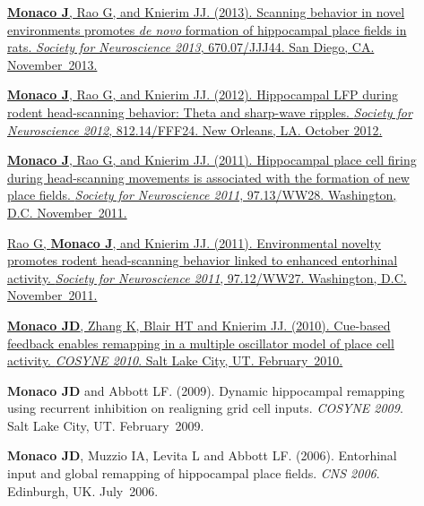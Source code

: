 \documentclass[10pt]{article}
\begin{document}
\begin{description}
\item[\quad] \href{http://www.abstractsonline.com/Plan/ViewAbstract.aspx?sKey=32eccac1-4e1d-4e81-bf5c-f39bcb605757&cKey=4710dece-cc8e-4b48-8764-49ea174b91ef&mKey=8d2a5bec-4825-4cd6-9439-b42bb151d1cf}{\textbf{Monaco J}, Rao G, and Knierim JJ. (2013). Scanning behavior in novel environments promotes \emph{de novo} formation of hippocampal place fields in rats. \emph{Society for Neuroscience 2013}, 670.07/JJJ44. San Diego, CA. November~2013.}
\item[\quad] \href{http://www.abstractsonline.com/Plan/ViewAbstract.aspx?sKey=f5b9fa94-7d15-48c7-9d67-b89cd2883025&cKey=a53349ca-41b1-4664-b022-85d0d1fe59b8&mKey=\%7b70007181-01C9-4DE9-A0A2-EEBFA14CD9F1\%7d}{\textbf{Monaco J}, Rao G, and Knierim JJ. (2012). Hippocampal LFP during rodent head-scanning behavior: Theta and sharp-wave ripples. \emph{Society for Neuroscience 2012}, 812.14/FFF24. New Orleans, LA. October 2012.}
\item[\quad] \href{http://www.abstractsonline.com/Plan/ViewAbstract.aspx?sKey=c48e9f5f-1274-4486-85bf-38ee591629e1&cKey=190bd951-c183-428d-a4c5-01eb61556d79&mKey=\%7b8334BE29-8911-4991-8C31-32B32DD5E6C8\%7d}{\textbf{Monaco J}, Rao G, and Knierim JJ. (2011). Hippocampal place cell firing during head-scanning movements is associated with the formation of new place fields. \emph{Society for Neuroscience 2011}, 97.13/WW28. Washington, D.C. November~2011.}
\item[\quad] \href{http://www.abstractsonline.com/Plan/ViewAbstract.aspx?sKey=c48e9f5f-1274-4486-85bf-38ee591629e1&cKey=3ec26e6f-8c59-4be2-bad3-e1572d75e07e&mKey=\%7b8334BE29-8911-4991-8C31-32B32DD5E6C8\%7d}{Rao G, \textbf{Monaco J}, and Knierim JJ. (2011). Environmental novelty promotes rodent head-scanning behavior linked to enhanced entorhinal activity. \emph{Society for Neuroscience 2011}, 97.12/WW27. Washington, D.C. November~2011.}
\item[\quad] \href{http://www.frontiersin.org/10.3389/conf.fnins.2010.03.00192/event_abstract}{\textbf{Monaco JD}, Zhang K, Blair HT and Knierim JJ. (2010). Cue-based feedback enables remapping in a multiple oscillator model of place cell activity. \emph{COSYNE 2010}. Salt Lake City, UT. February~2010.}
\item[\quad] \textbf{Monaco JD} and Abbott LF. (2009). Dynamic hippocampal remapping using recurrent inhibition on realigning grid cell inputs. \emph{COSYNE 2009}. Salt Lake City, UT. February~2009.
\item[\quad] \textbf{Monaco JD}, Muzzio IA, Levita L and Abbott LF. (2006). Entorhinal input and global remapping of hippocampal place fields. \emph{CNS 2006}. Edinburgh, UK. July~2006.

\end{description}
\end{document}
